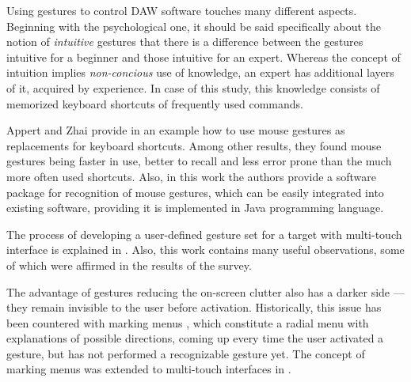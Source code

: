 \documentclass{aes130}
\begin{document}
Using gestures to control DAW software touches many different aspects. Beginning with the psychological one,
it should be said specifically about the notion of \emph{intuitive} gestures that there is a difference
between the gestures intuitive for a beginner and those intuitive for an expert. Whereas the concept of
intuition implies \emph{non-concious} use of knowledge\cite{Naumann:2007:IUU:1784197.1784212}, an expert
has additional layers of it, acquired by experience. In case of this study, this knowledge consists of
memorized keyboard shortcuts of frequently used commands.

Appert and Zhai provide in \cite{Appert:2009:USC:1518701.1519052} an example how to use mouse gestures
as replacements for keyboard shortcuts. Among other results, they found mouse gestures being faster in use,
better to recall and less error prone than the much more often used shortcuts. Also, in this work
the authors provide a software package for recognition of mouse gestures, which can be easily integrated
into existing software, providing it is implemented in Java programming language.

The process of developing a user-defined gesture set for a target with multi-touch interface is explained
in \cite{Wobbrock:2009:UGS:1518701.1518866}. Also, this work contains many useful observations, some of which
were affirmed in the results of the survey.

The advantage of gestures reducing the on-screen clutter also has a darker side --- they remain invisible
to the user before activation. Historically, this issue has been countered with marking menus
\cite{Kurtenbach:1993:LEP:164632.164977,Kurtenbach:1994:ULP:259963.260376}, which constitute a radial menu
with explanations of possible directions, coming up every time the user activated a gesture, but has not
performed a recognizable gesture yet. The concept of marking menus was extended to multi-touch interfaces
in \cite{Lepinski:2010:DEM:1753326.1753663}.
\end{document}
